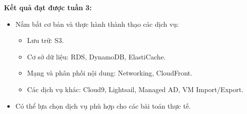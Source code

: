 \vspace{0.5em}\noindent\textbf{Kết quả đạt được tuần
3:}\par

\begin{itemize}
\tightlist
\item
  Nắm bắt cơ bản và thực hành thành thạo các dịch vụ:

  \begin{itemize}
  \tightlist
  \item
    Lưu trữ: S3.
  \item
    Cơ sở dữ liệu: RDS, DynamoDB, ElastiCache.
  \item
    Mạng và phân phối nội dung: Networking, CloudFront.
  \item
    Các dịch vụ khác: Cloud9, Lightsail, Managed AD, VM Import/Export.
  \end{itemize}
\item
  Có thể lựa chọn dịch vụ phù hợp cho các bài toán thực tế.
\end{itemize}
